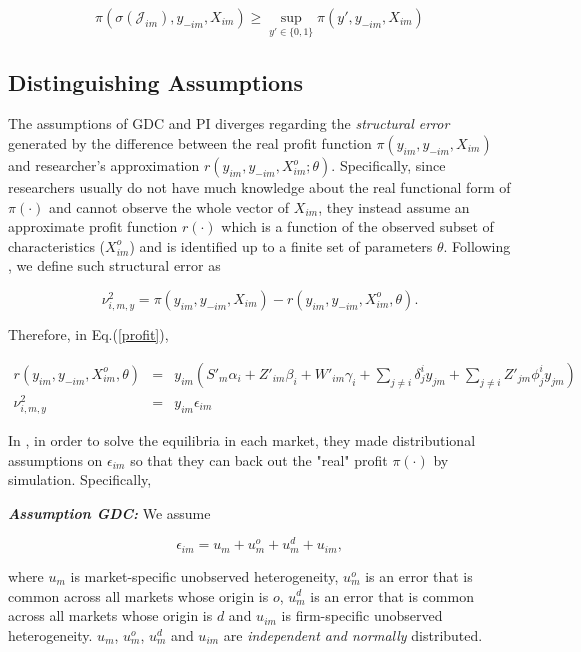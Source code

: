\documentclass[draft]{article}
\begin{document}
\begin{equation}
\pi(\sigma(\mathcal{J}_{im}),y_{-im},X_{im}) \geq \sup_{y'\in \{0,1\}} \pi(y',y_{-im},X_{im})
\label{ie3}
\end{equation}

\subsection{Distinguishing Assumptions}

The assumptions of GDC and PI diverges regarding the \textit{structural error} generated by the difference between the real profit function $\pi(y_{im},y_{-im},X_{im})$ and researcher's approximation $r(y_{im},y_{-im},X^o_{im}; \theta)$. Specifically, since researchers usually do not have much knowledge about the real functional form of $\pi(\cdot)$ and cannot observe the whole vector of $X_{im}$, they instead assume an approximate profit function $r(\cdot)$ which is a function of the observed subset of characteristics ($X^o_{im}$) and is identified up to a finite set of parameters $\theta$. Following \cite{pakes2015moment}, we define such structural error as

\begin{equation}
\nu^2_{i,m,y}=\pi(y_{im},y_{-im},X_{im})-r(y_{im},y_{-im},X^o_{im},\theta).
\end{equation}

Therefore, in Eq.(\ref{profit}),

\begin{eqnarray}
r(y_{im},y_{-im},X^o_{im},\theta)&=&y_{im}(S'_m\alpha_i+Z'_{im}\beta_i+W'_{im}\gamma_i+\sum_{j\neq i}\delta_{j}^i y_{jm}+\sum_{j\neq i}Z'_{jm}\phi_j^iy_{jm})\\
\nu^2_{i,m,y}&=&y_{im}\epsilon_{im}
\end{eqnarray}


In \cite{ciliberto2009market}, in order to solve the equilibria in each market, they made distributional assumptions on $\epsilon_{im}$ so that they can back out the "real" profit $\pi(\cdot)$ by simulation. Specifically,

\bigskip
\textbf{\textit{Assumption GDC:}} We assume

$$\epsilon_{im}=u_{m}+u^o_{m}+u^d_{m}+u_{im},$$

where $u_m$ is market-specific unobserved heterogeneity, $u^o_m$ is an error that is common across all markets whose origin is $o$, $u^d_m$ is an error that is common across all markets whose origin is $d$ and $u_{im}$ is firm-specific unobserved heterogeneity. $u_m$, $u^o_m$, $u^d_m$ and $u_{im}$ are \textit{independent and normally} distributed.
\bigskip
\end{document}
